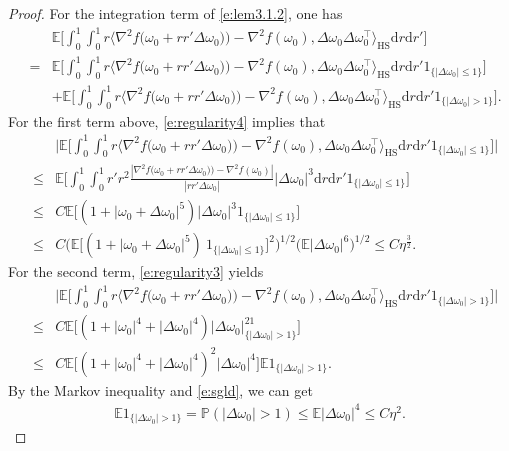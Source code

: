 \documentclass[12pt]{amsart}
\theoremstyle{definition}
\theoremstyle{remark}
\numberwithin{equation}{section}
\newcommand{\dif}{\mathrm{d}}
\newcommand{\E}{\mathbb{E}}            %
\newcommand{\Ll}{\langle}
\newcommand{\Rr}{\rangle}
\newcommand{\PP}{\mathbb{P}}
\begin{document}
\begin{proof}
For the integration term of \eqref{e:lem3.1.2}, one has
\begin{eqnarray*}
&&\E\big[\int_0^1\int_0^1 r\Ll \nabla^2f\big(\omega_0+rr'\Delta\omega_0)\big)-\nabla^2f(\omega_0),\Delta\omega_0\Delta\omega_0^\top    \Rr_{\text {HS}}\dif r\dif r'\big]\\
&=&\E\big[\int_0^1\int_0^1 r\Ll \nabla^2f\big(\omega_0+rr'\Delta\omega_0)\big)-\nabla^2f(\omega_0),\Delta\omega_0\Delta\omega_0^\top     \Rr_{\text {HS}}\dif r\dif r'1_{\{|\Delta\omega_0|\le1\}}\big]\\
&&+\E\big[\int_0^1\int_0^1 r\Ll \nabla^2f\big(\omega_0+rr'\Delta\omega_0)\big)-\nabla^2f(\omega_0),\Delta\omega_0\Delta\omega_0^\top     \Rr_{\text {HS}}\dif r\dif r'1_{\{|\Delta\omega_0|>1\}}\big].
\end{eqnarray*}
For the first term above, \eqref{e:regularity4} implies that
\begin{eqnarray*}
&& \big|\E\big[\int_0^1\int_0^1 r\Ll \nabla^2f\big(\omega_0+rr'\Delta\omega_0)\big)-\nabla^2f(\omega_0),\Delta\omega_0\Delta\omega_0^\top     \Rr_{\text {HS}}\dif r\dif r'1_{\{|\Delta\omega_0|\le1\}}\big]\big|\\
&\le&\E\big[\int_0^1\int_0^1 r' r^2 \frac{|\nabla^2f\big(\omega_0+rr'\Delta\omega_0)\big)-\nabla^2f(\omega_0)|}{|rr'\Delta\omega_0|}|\Delta\omega_0|^3 \dif r\dif r'1_{\{|\Delta\omega_0|\le1\}}\big]\\
&\le& C\E\big[(1+|\omega_0+\Delta\omega_0|^5)|\Delta\omega_0|^3 1_{\{|\Delta\omega_0|\le1\}}\big]\\
&\le& C\big(\E\big[(1+|\omega_0+\Delta\omega_0|^5)\ 1_{\{|\Delta\omega_0|\le1\}}\big]^2\big)^{1/2} \big(\E|\Delta\omega_0|^6\big)^{1/2}
\le C\eta^{\frac32}.
\end{eqnarray*}
For the second term, \eqref{e:regularity3} yields
\begin{eqnarray*}
&&\big|\E\big[\int_0^1\int_0^1 r\Ll \nabla^2f\big(\omega_0+rr'\Delta\omega_0)\big)-\nabla^2f(\omega_0),\Delta\omega_0\Delta\omega_0^\top     \Rr_{\text {HS}}\dif r\dif r' 1_{\{|\Delta\omega_0|>1\}}\big]\big|\\
&\le&C\E\big[(1+|\omega_0|^4+|\Delta\omega_0|^4)|\Delta\omega_0|^21_{\{|\Delta\omega_0|>1\}}\big]\\
&\le&C\E\big[(1+|\omega_0|^4+|\Delta\omega_0|^4)^2|\Delta\omega_0|^4\big]\E1_{\{|\Delta\omega_0|>1\}}.
\end{eqnarray*}
By the Markov inequality and \eqref{e:sgld}, we can get
\begin{eqnarray*}
\E1_{\{|\Delta\omega_0|>1\}}=\PP(|\Delta\omega_0|>1)\le \E|\Delta\omega_0|^4\le C\eta^2.

\end{eqnarray*}
\end{proof}
\end{document}
